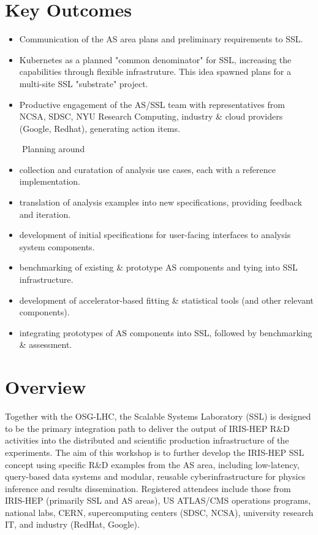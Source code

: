 \documentclass[11pt,letterpaper,fleqn]{article}
\begin{document}
\section*{Key Outcomes}
\vspace{3pt}
\begin{itemize}
  \item Communication of the AS area plans and preliminary requirements to SSL.
  \item Kubernetes as a planned "common denominator" for SSL, increasing the capabilities through flexible infrastruture. This idea spawned plans for a multi-site SSL "substrate" project.
  \item Productive engagement of the AS/SSL team with representatives from NCSA, SDSC, NYU Research Computing, industry \& cloud providers (Google, Redhat), generating action items.
\end{itemize}
\vspace{-5pt}
~~~~Planning around
\vspace{-5pt}
\begin{itemize}
  \item collection and curatation of analysis use cases, each with a reference implementation.
  \item translation of analysis examples into new specifications, providing feedback and iteration.
  \item development of initial specifications for user-facing interfaces to analysis system components.
  \item benchmarking of existing \& prototype AS components and tying into SSL infrastructure.
  \item development of accelerator-based fitting \& statistical tools (and other relevant components).
  \item integrating prototypes of AS components into SSL, followed by benchmarking \& assessment.
\end{itemize}


\newpage
\thispagestyle{reststyle}

\section{Overview}
Together with the OSG-LHC, the Scalable Systems Laboratory (SSL) is designed to be the primary integration path to deliver the output of IRIS-HEP R\&D activities into the distributed and scientific production infrastructure of the experiments. The aim of this workshop is to further develop the IRIS-HEP SSL concept using specific R\&D examples from the AS area, including  low-latency, query-based data systems and modular, reusable cyberinfrastructure for physics inference and results dissemination. Registered attendees include those from IRIS-HEP (primarily SSL and AS areas), US ATLAS/CMS operations programs, national labs, CERN, supercomputing centers (SDSC, NCSA), university research IT, and industry (RedHat, Google).
\end{document}
